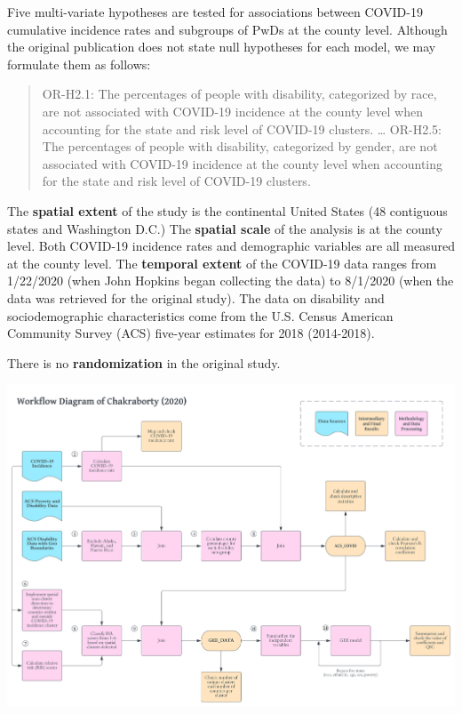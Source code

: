 \documentclass[
]{article}
\begin{document}
Five multi-variate hypotheses are tested for associations between
COVID-19 cumulative incidence rates and subgroups of PwDs at the county
level. Although the original publication does not state null hypotheses
for each model, we may formulate them as follows:

\begin{quote}
OR-H2.1: The percentages of people with disability, categorized by race,
are not associated with COVID-19 incidence at the county level when
accounting for the state and risk level of COVID-19 clusters. \ldots{}
OR-H2.5: The percentages of people with disability, categorized by
gender, are not associated with COVID-19 incidence at the county level
when accounting for the state and risk level of COVID-19 clusters.
\end{quote}

The \textbf{spatial extent} of the study is the continental United
States (48 contiguous states and Washington D.C.) The \textbf{spatial
scale} of the analysis is at the county level. Both COVID-19 incidence
rates and demographic variables are all measured at the county level.
The \textbf{temporal extent} of the COVID-19 data ranges from 1/22/2020
(when John Hopkins began collecting the data) to 8/1/2020 (when the data
was retrieved for the original study). The data on disability and
sociodemographic characteristics come from the U.S. Census American
Community Survey (ACS) five-year estimates for 2018 (2014-2018).

There is no \textbf{randomization} in the original study.

\includegraphics{../../docs/report/workflow.jpg}
\end{document}
